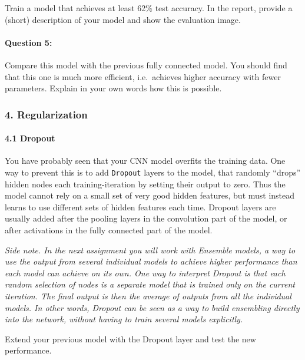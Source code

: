 \documentclass[11pt]{article}
\begin{document}
Train a model that achieves at least 62\% test accuracy. In the report,
provide a (short) description of your model and show the evaluation
image.

    \hypertarget{question-5}{%
\paragraph{\texorpdfstring{\textbf{{Question
5:}}}{Question 5:}}\label{question-5}}

Compare this model with the previous fully connected model. You should
find that this one is much more efficient, i.e.~achieves higher accuracy
with fewer parameters. Explain in your own words how this is possible.

    \hypertarget{regularization}{%
\subsubsection{\texorpdfstring{\textbf{4.
Regularization}}{4. Regularization}}\label{regularization}}

    \hypertarget{dropout}{%
\paragraph{\texorpdfstring{\textbf{4.1
Dropout}}{4.1 Dropout}}\label{dropout}}

You have probably seen that your CNN model overfits the training data.
One way to prevent this is to add \texttt{Dropout} layers to the model,
that randomly ``drops'' hidden nodes each training-iteration by setting
their output to zero. Thus the model cannot rely on a small set of very
good hidden features, but must instead learns to use different sets of
hidden features each time. Dropout layers are usually added after the
pooling layers in the convolution part of the model, or after
activations in the fully connected part of the model.

\emph{Side note. In the next assignment you will work with Ensemble
models, a way to use the output from several individual models to
achieve higher performance than each model can achieve on its own. One
way to interpret Dropout is that each random selection of nodes is a
separate model that is trained only on the current iteration. The final
output is then the average of outputs from all the individual models. In
other words, Dropout can be seen as a way to build ensembling directly
into the network, without having to train several models explicitly.}

Extend your previous model with the Dropout layer and test the new
performance.
\end{document}
